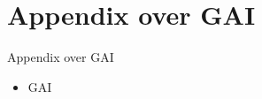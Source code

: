 \documentclass{beamer}
\begin{document}
\section{Appendix over GAI}
\begin{frame}{Appendix over GAI}
    \begin{itemize}
        \item GAI
    \end{itemize}
\end{frame}
\end{document}
